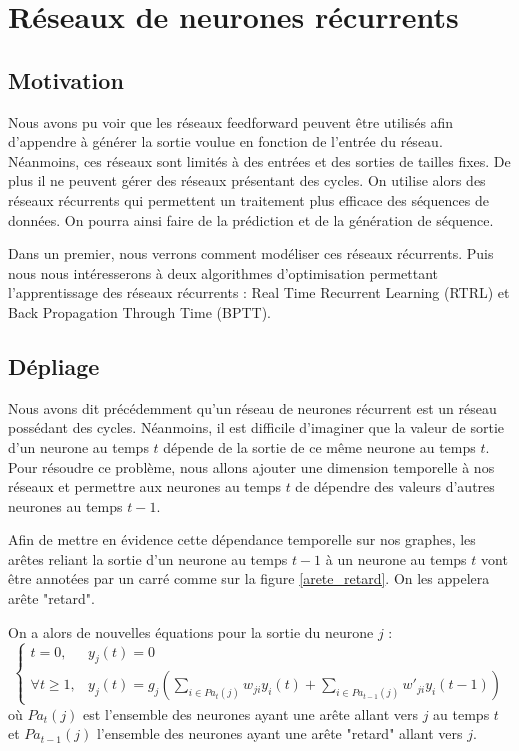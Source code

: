 \chapter{Réseaux de neurones récurrents}
\section{Motivation}
Nous avons pu voir que les réseaux feedforward peuvent être utilisés afin d'appendre à générer la sortie voulue en fonction de l'entrée du réseau. 
Néanmoins, ces réseaux sont limités à des entrées et des sorties de tailles fixes. De plus il ne peuvent gérer des réseaux présentant des cycles. On utilise alors des réseaux récurrents qui permettent un traitement plus efficace des séquences de données. On pourra ainsi faire de la prédiction et de la génération de séquence.

Dans un premier, nous verrons comment modéliser ces réseaux récurrents. Puis nous nous intéresserons à deux algorithmes d'optimisation permettant l'apprentissage des réseaux récurrents : Real Time Recurrent Learning (RTRL) et Back Propagation Through Time (BPTT).

\section{Dépliage}

Nous avons dit précédemment qu'un réseau de neurones récurrent est un réseau possédant des cycles. Néanmoins, il est difficile d'imaginer que la valeur de sortie d'un neurone au temps $t$ dépende de la sortie de ce même neurone au temps $t$. Pour résoudre ce problème, nous allons ajouter une dimension temporelle à nos réseaux et permettre aux neurones au temps $t$ de dépendre des valeurs d'autres neurones au temps $t-1$.

Afin de mettre en évidence cette dépendance temporelle sur nos graphes, les arêtes reliant la sortie d'un neurone au temps $t-1$ à un neurone au temps $t$ vont être annotées par un carré comme sur la figure \ref{arete_retard}. On les appelera arête "retard".


On a alors de nouvelles équations pour la sortie du neurone $j$ :
\begin{equation}
\left\{
\begin{array}{ll}
t = 0, & y_j(t) = 0 \\
\forall t \geq 1, & y_{j}(t) = g_{j}(\sum_{i \in Pa_t(j)}{w_{ji}y_{i}(t)} + \sum_{i \in Pa_{t-1}(j)}{w'_{ji}y_{i}(t-1)})
\end{array}
\right.
\end{equation}
où $Pa_t(j)$ est l'ensemble des neurones ayant une arête allant vers $j$ au temps $t$ et $Pa_{t-1}(j)$ l'ensemble des neurones ayant une arête "retard" allant vers $j$.

